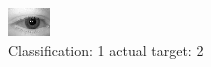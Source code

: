 \begin{figure}[h!]
\begin{center}
\includegraphics[width=0.60\columnwidth]{figures/ID369_class_1_target_2.png}
\end{center}
\caption{ Classification: 1 actual target: 2}
\label{fig:ID369_class_1_target_2}
\end{figure}

